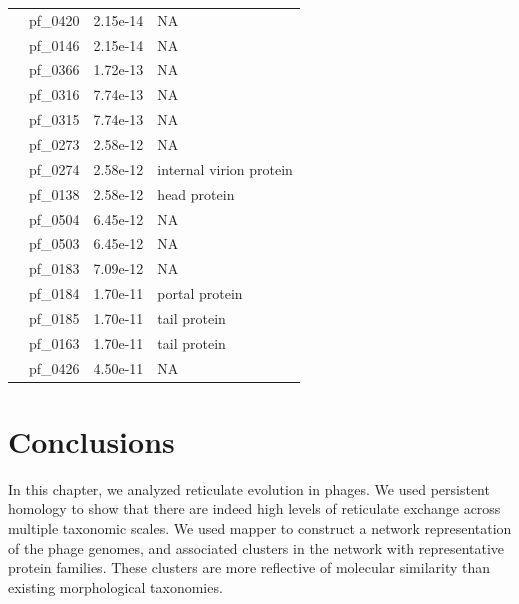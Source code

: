 \begin{table}
\begin{lrbox}{\rightbox}
\begin{tabular}[t]{llll}
                                        & pf\_0420 & 2.15e-14 & NA \\ 
                                        & pf\_0146 & 2.15e-14 & NA \\ 
                                        & pf\_0366 & 1.72e-13 & NA \\ 
                                        & pf\_0316 & 7.74e-13 & NA \\ 
                                        & pf\_0315 & 7.74e-13 & NA \\ 
                                        & pf\_0273 & 2.58e-12 & NA \\ 
                                        & pf\_0274 & 2.58e-12 & internal virion protein \\ 
                                        & pf\_0138 & 2.58e-12 & head protein \\ 
                                        & pf\_0504 & 6.45e-12 & NA \\ 
                                        & pf\_0503 & 6.45e-12 & NA \\ 
                                        & pf\_0183 & 7.09e-12 & NA \\ 
                                        & pf\_0184 & 1.70e-11 & portal protein \\ 
                                        & pf\_0185 & 1.70e-11 & tail protein \\ 
                                        & pf\_0163 & 1.70e-11 & tail protein \\ 
                                        & pf\_0426 & 4.50e-11 & NA \\ 
            \bottomrule
            \end{tabular}
    \end{lrbox}


    \centering
    \makebox[0pt]{%
        \hspace*{\fill}
        \begin{minipage}[t]{\wd\leftbox}
        \usebox{\leftbox}
        \end{minipage}\hfill
        \begin{minipage}[t]{\wd\rightbox}
        \usebox{\rightbox}
        \end{minipage}
        \hspace*{\fill}
        }
    \label{phage:table:cluster_functions}
\end{table}


\section{Conclusions}
\label{phage:sec:conclusions}

In this chapter, we analyzed reticulate evolution in phages.
We used persistent homology to show that there are indeed high levels of reticulate exchange across multiple taxonomic scales.
We used mapper to construct a network representation of the phage genomes, and associated clusters in the network with representative protein families.
These clusters are more reflective of molecular similarity than existing morphological taxonomies.